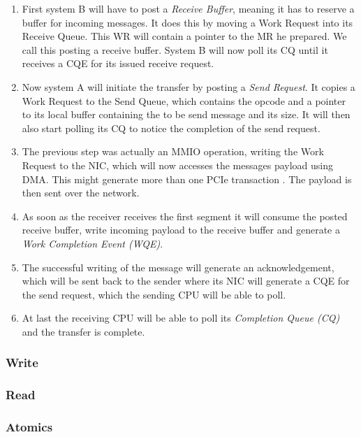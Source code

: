 \begin{enumerate}
  \item First system B will have to post a \emph{Receive Buffer}, meaning it has to reserve a buffer for incoming messages.
    It does this by moving a Work Request into its Receive Queue. This WR will contain a pointer to the MR he prepared. We
    call this posting a receive buffer. System B will now poll its CQ until it receives a CQE for its issued receive request.
  \item Now system A will initiate the transfer by posting a \emph{Send Request}. It copies a Work Request to the Send 
    Queue, which contains the  opcode and a pointer to its local buffer containing the to be send message
    and its size. It will then also start polling its CQ to notice the completion of the send request.
  \item The previous step was actually an MMIO operation, writing the Work Request to the NIC, which will now 
    accesses the messages payload using DMA. This  might generate more than one PCIe transaction \cite{atc16-kalia}. 
    The payload is then sent over the network.
  \item As soon as the receiver receives the first segment it will consume the posted receive buffer, write incoming payload 
    to the receive buffer and generate a \emph{Work Completion Event (WQE)}. 
  \item The successful writing of the message will generate an acknowledgement, which will be sent back to the sender where 
    its NIC will generate a CQE for the send request, which the sending CPU will be able to poll.
  \item At last the receiving CPU will be able to poll its \emph{Completion Queue (CQ)} and the transfer is complete.
\end{enumerate}








\subsubsection{Write}
\subsubsection{Read}
\subsubsection{Atomics}
